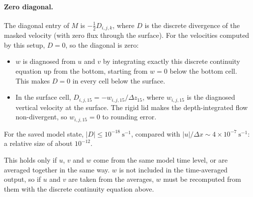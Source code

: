 \documentclass{article}
\begin{document}
\paragraph{Zero diagonal.}
The diagonal entry of $M$ is $-\tfrac12 D_{i,j,k}$, where $D$ is the discrete divergence of the masked velocity (with zero flux through the surface).
For the velocities computed by this setup, $D = 0$, so the diagonal is zero:
\begin{itemize}
\item $w$ is diagnosed from $u$ and $v$ by integrating exactly this discrete continuity equation up from the bottom, starting from $w = 0$ below the bottom cell.
This makes $D = 0$ in every cell below the surface.
\item In the surface cell, $D_{i,j,15} = -w_{i,j,15}/\Delta z_{15}$, where $w_{i,j,15}$ is the diagnosed vertical velocity at the surface.
The rigid lid makes the depth-integrated flow non-divergent, so $w_{i,j,15} = 0$ to rounding error.
\end{itemize}
For the saved model state, $|D| \le 10^{-18}~\text{s}^{-1}$, compared with $|u|/\Delta x \sim 4\times10^{-7}~\text{s}^{-1}$: a relative size of about $10^{-12}$.

This holds only if $u$, $v$ and $w$ come from the same model time level, or are averaged together in the same way.
$w$ is not included in the time-averaged output, so if $u$ and $v$ are taken from the averages, $w$ must be recomputed from them with the discrete continuity equation above.
\end{document}

